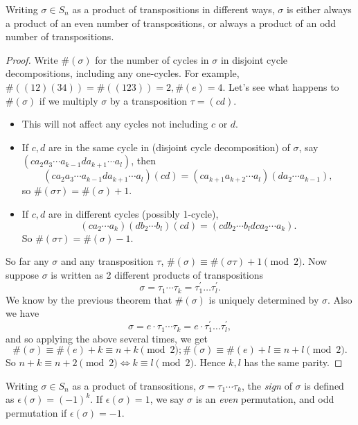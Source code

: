 \documentclass[a4paper]{article}
\begin{document}
\begin{theorem}\label{thm:parity_transposition}
  Writing $ \sigma\in S_n $ as a product of transpositions in
  different ways, $\sigma$ is either always a product of an even
  number of transpositions, or always a product of an odd number of
  transpositions.
\end{theorem}
\begin{proof}
  Write $ \#(\sigma) $ for the number of cycles in $ \sigma $ in
  disjoint cycle decompositions, including any one-cycles. For
  example, $ \#((12)(34))=\#((123))=2, \#(e)=4 $. Let's see   what
  happens to $ \#(\sigma) $ if we multiply $ \sigma $ by a
  transposition $ \tau=(cd) $.
  \begin{itemize}[-]
    \item This will not affect any cycles not including $c$ or $d$.
    \item If $c,d$ are in the same cycle in (disjoint cycle
      decomposition) of $ \sigma$, say $ (c a_2 a_3 \cdots a_{k-1} d
      a_{k+1} \cdots a_l) $, then
      \[
        (c a_2 a_3 \cdots a_{k-1} d  a_{k+1} \cdots a_l)(cd)=(c
        a_{k+1} a_{k+2} \cdots a_l)(d a_2 \cdots a_{k-1})
      ,\]
      so $ \#(\sigma \tau) =\#(\sigma)+1$.
    \item If $c,d$ are in different cycles (possibly 1-cycle),
      \[
        (ca_2\cdots a_k)(db_2\cdots b_l)(cd)=(cdb_2\cdots b_ldca_2\cdots a_k)
      .\]
      So $ \# (\sigma\tau)=\#(\sigma)-1 $.
  \end{itemize}
  So far any $ \sigma $ and any transposition $ \tau $, $
  \#(\sigma)\equiv\#(\sigma \tau)+1\pmod 2$. Now suppose $ \sigma $
  is written as 2 different products of transpositions
  \[
    \sigma=\tau_{1} \cdots \tau_{k}=\tau_{1}^{\prime} \ldots \tau_{l}^{\prime}
  .\]
  We know by the previous theorem that $ \#(\sigma) $ is uniquely
  determined by $\sigma$. Also we have
  \[
    \sigma=e\cdot \tau_{1} \cdots \tau_{k}= e\cdot \tau_{1}^{\prime}
    \ldots \tau_{l}^{\prime}
  ,\]
  and so applying the above several times, we get
  \[
    \#(\sigma)\equiv \#(e)+k\equiv n+k\pmod 2; \#(\sigma)\equiv
    \#(e)+l\equiv n+l\pmod 2
  .\]
  So $ n+k\equiv n+2\pmod 2 \Leftrightarrow k\equiv l\pmod 2 $. Hence
  $k,l$ has the same parity.
\end{proof}
\begin{definition}
  Writing $ \sigma\in S_n $ as a product of transositions, $ \sigma
  =\tau_{1} \cdots \tau_{k}$, the \textit{sign} of $ \sigma $ is
  defined as $ \epsilon(\sigma)=(-1)^k $. If $ \epsilon(\sigma)=1 $,
  we say $ \sigma $ is an \textit{even} permutation, and odd
  permutation if $ \epsilon(\sigma)=-1 $.
\end{definition}
\end{document}

